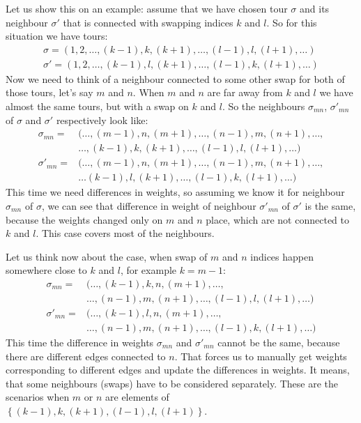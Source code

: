 		Let us show this on an example: assume that we have chosen tour $\sigma$ and its neighbour $\sigma'$ that is connected with swapping indices $k$ and $l$. So for this situation we have tours:
		\begin{align*}
			\sigma = (1, 2, \ldots, (k-1), k, (k+1), \ldots, (l-1), l, (l+1), \ldots) \\
			\sigma' = (1, 2, \ldots, (k-1), l, (k+1), \ldots, (l-1), k, (l+1), \ldots)
		\end{align*}
		Now we need to think of a neighbour connected to some other swap for both of those tours, let's say $m$ and $n$. When $m$ and $n$ are far away from $k$ and $l$ we have almost the same tours, but with a swap on $k$ and $l$. So the neighbours $\sigma_{mn}$, $\sigma'_{mn}$ of $\sigma$ and $\sigma'$ respectively look like: 
		\begin{align*}
			\sigma_{mn} = &(\ldots, (m-1), n, (m+1), \ldots, (n-1), m,( n+1), \ldots, \\
			&\ldots, (k-1), k, (k+1), \ldots, (l-1), l, (l+1), \ldots) \\
			\sigma'_{mn} = &(\ldots, (m-1), n, (m+1), \ldots, (n-1), m, (n+1), \ldots, \\
			&\ldots (k-1), l, (k+1), \ldots, (l-1), k, (l+1), \ldots)
		\end{align*}
		This time we need differences in weights, so assuming we know it for neighbour $\sigma_{mn}$ of $\sigma$, we can see that difference in weight of neighbour $\sigma'_{mn}$ of $\sigma'$ is the same, because the weights changed only on $m$ and $n$ place, which are not connected to $k$ and $l$. This case covers most of the neighbours. 
		
		Let us think now about the case, when swap of $m$ and $n$ indices happen somewhere close to $k$ and $l$, for example $k = m-1$:
		\begin{align*}
			\sigma_{mn} = &(\ldots, (k-1), k, n, (m+1), \ldots, \\
			&\ldots, (n-1), m,( n+1), \ldots, (l-1), l, (l+1), \ldots) \\
			\sigma'_{mn} = &(\ldots, (k-1), l, n, (m+1), \ldots, \\
			& \ldots, (n-1), m, (n+1), \ldots, (l-1), k, (l+1), \ldots)
		\end{align*}
		This time the difference in weights $\sigma_{mn}$ and $\sigma'_{mn}$ cannot be the same, because there are different edges connected to $n$. That forces us to manually get weights corresponding to different edges and update the differences in weights. It means, that some neighbours (swaps) have to be considered separately. These are the scenarios when $m$ or $n$ are elements of $\left\{ (k-1), k, (k+1), (l-1), l, (l+1) \right\}$.
		
